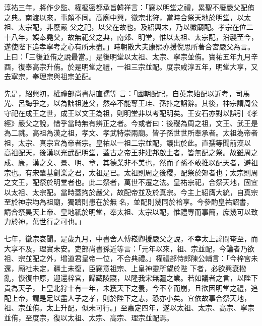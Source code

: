 \begin{pinyinscope}
 淳祐三年，將作少監、權樞密都承旨韓祥言：「竊以明堂之禮，累聖不廢嚴父配侑之典。南渡以來，事頗不同。高廟中興，徽宗北狩，當時合祭天地於明堂，以太祖、太宗配，非廢嚴
 父之祀，以父在故也。及紹興末，乃以徽廟配。孝宗在位二十八年，娛奉堯父，故無祀父之典，南郊、明堂，惟以太祖、太宗配，沿襲至今，遂使陛下追孝寧考之心有所未盡。」時朝散大夫康熙亦援倪思所著合宮嚴父為言。上曰：「三後並侑之說最當。」是後明堂以太祖、太宗、寧宗並侑。寶祐五年九月辛酉，復奉高宗升侑。於是明堂之禮，一祖三宗並配。度宗咸淳五年，明堂大享，又去寧宗，奉理宗與祖宗並配。



 先是，紹興初，權禮部尚書胡直孺等
 言：「國朝配祀，自英宗始配以近考，司馬光、呂誨爭之，以為詘祖進父，然卒不能奪王珪、孫抃之諂辭。其後，神宗謂周公守祀在成王之世，成王以文王為祖，則明堂非以考配明矣。王安石亦對以誤引《孝經》嚴父之說，惜乎當時無有辨正之者。今或者曰：後稷為周之祖，文王、武王是為二祧。高祖為漢之祖，孝文、孝武特崇兩廟。皆子孫世世所奉承者。太祖為帝者祖，太宗、真宗宜為帝者宗。皇祐以一祖二宗並配，議出於此。直孺等聞前漢以
 高祖配天，後漢以光武配明堂，蓋古之帝王非建邦啟土者，皆無配之祭。故雖周之成、康，漢之文、景、明、章，其德業非不美也，然而子孫不敢推以配天者，避祖宗也。有宋肇基創業之君，太祖是已。太祖則周之後稷，配祭於郊者也；太宗則周之文王，配祭於明堂者也。此二祭者，萬世不遷之法。皇祐宗祀，合祭天地，固宜以太祖、太宗配。當時蓋拘於嚴父，故配帝並及於真宗。今主上紹膺大統，自真宗至於神宗均為祖廟，獨躋則患在於無
 名，並配則幾同於袷享。今參酌皇祐詔書，請合祭昊天上帝、皇地祇於明堂，奉太祖、太宗以配，惟禮專而事簡，庶幾可以致力於神，萬世行之可也。」



 七年，徽宗哀聞。是歲九月，中書舍人傅崧卿援嚴父之說，不幸太上諱問奄至，而大享不及，理實未安。吏部尚書孫近等言：「元年以來，祖、宗並配，今論者乃欲祖、宗並配之外，增道君皇帝一位，不合典禮。」權禮部侍郎陳公輔言：「今梓宮未還，廟社未定，疆土未復，臣竊意祖宗、上皇神靈所望於陛
 下者，必欲興衰撥亂，恢復中原，迎還梓宮，歸藏陵寢，以隆我宋無疆之業。若如議者之言，以陛下貴為天子，上皇北狩十有一年，未獲天下之養，今不幸而崩，且欲因明堂之禮，追配上帝，謂是足以盡人子之孝，則於陛下之志，恐亦小矣。宜依故事合祭天地，祖、宗並侑。太上升配，似未可行。」至嘉定四年，遂以太祖、太宗、高宗、寧宗並侑，至度宗，復以太祖、太宗、高宗、理宗並配焉。



\end{pinyinscope}